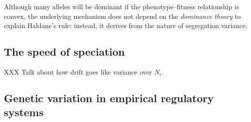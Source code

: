 \documentclass{article}
\newcommand{\plr}[1]{\todo[color=blue!25]{#1}}
\newcommand{\plr}[1]{{\color{blue}\it #1}}
\newcommand{\1}{\mathbbm{1}}
\begin{document}
Although many alleles will be dominant if the phenotype--fitness relationship is convex,
the underlying mechanism does not depend on the \emph{dominance theory} \citet{turelli1995dominance} to explain Haldane's rule:
instead, it derives from the nature of segregation variance.

\subsection*{The speed of speciation}

XXX Talk about how drift goes like variance over $N_e$.

\subsection*{Genetic variation in empirical regulatory systems}
\end{document}
